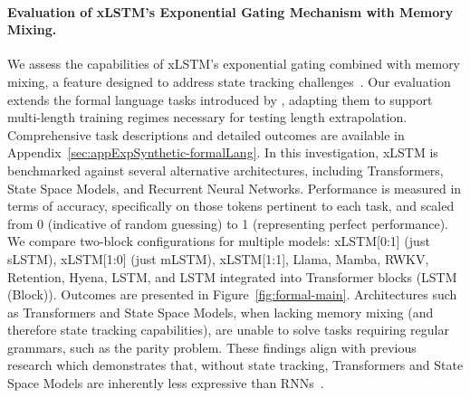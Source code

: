 \paragraph{Evaluation of xLSTM's Exponential Gating Mechanism with Memory Mixing.} We assess the capabilities of xLSTM's exponential gating combined with memory mixing, a feature designed to address state tracking challenges~\citep{Merrill:24, Merrill:23}. Our evaluation extends the formal language tasks introduced by \citet{Deletang:23}, adapting them to support multi-length training regimes necessary for testing length extrapolation. Comprehensive task descriptions and detailed outcomes are available in Appendix~\ref{sec:appExpSynthetic-formalLang}. In this investigation, xLSTM is benchmarked against several alternative architectures, including Transformers, State Space Models, and Recurrent Neural Networks. Performance is measured in terms of accuracy, specifically on those tokens pertinent to each task, and scaled from 0 (indicative of random guessing) to 1 (representing perfect performance). We compare two-block configurations for multiple models: xLSTM[0:1] (just sLSTM), xLSTM[1:0] (just mLSTM), xLSTM[1:1], Llama, Mamba, RWKV, Retention, Hyena, LSTM, and LSTM integrated into Transformer blocks (LSTM (Block)). Outcomes are presented in Figure~\ref{fig:formal-main}. Architectures such as Transformers and State Space Models, when lacking memory mixing (and therefore state tracking capabilities), are unable to solve tasks requiring regular grammars, such as the parity problem. These findings align with previous research which demonstrates that, without state tracking, Transformers and State Space Models are inherently less expressive than RNNs~\citep{Merrill:24, Merrill:23, Deletang:23}.

